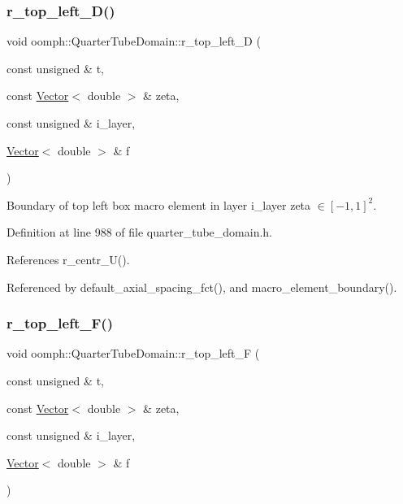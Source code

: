 \subsubsection{\texorpdfstring{r\+\_\+top\+\_\+left\+\_\+\+D()}{r\_top\_left\_D()}}
{\footnotesize\ttfamily void oomph\+::\+Quarter\+Tube\+Domain\+::r\+\_\+top\+\_\+left\+\_\+D (\begin{DoxyParamCaption}\item[{const unsigned \&}]{t,  }\item[{const \hyperlink{classoomph_1_1Vector}{Vector}$<$ double $>$ \&}]{zeta,  }\item[{const unsigned \&}]{i\+\_\+layer,  }\item[{\hyperlink{classoomph_1_1Vector}{Vector}$<$ double $>$ \&}]{f }\end{DoxyParamCaption})\hspace{0.3cm}{\ttfamily [private]}}



Boundary of top left box macro element in layer i\+\_\+layer zeta $ \in [-1,1]^2 $. 



Definition at line 988 of file quarter\+\_\+tube\+\_\+domain.\+h.



References r\+\_\+centr\+\_\+\+U().



Referenced by default\+\_\+axial\+\_\+spacing\+\_\+fct(), and macro\+\_\+element\+\_\+boundary().

\mbox{\label{classoomph_1_1QuarterTubeDomain_aee4f92da89db4fd8a7ff6e25995e1ca5}} 
\subsubsection{\texorpdfstring{r\+\_\+top\+\_\+left\+\_\+\+F()}{r\_top\_left\_F()}}
{\footnotesize\ttfamily void oomph\+::\+Quarter\+Tube\+Domain\+::r\+\_\+top\+\_\+left\+\_\+F (\begin{DoxyParamCaption}\item[{const unsigned \&}]{t,  }\item[{const \hyperlink{classoomph_1_1Vector}{Vector}$<$ double $>$ \&}]{zeta,  }\item[{const unsigned \&}]{i\+\_\+layer,  }\item[{\hyperlink{classoomph_1_1Vector}{Vector}$<$ double $>$ \&}]{f }\end{DoxyParamCaption})\hspace{0.3cm}{\ttfamily [private]}}




